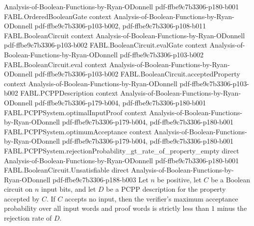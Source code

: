 \begin{theorem}
  {Analysis-of-Boolean-Functions-by-Ryan-ODonnell}
  {pdf-ffbe9c7b3306-p180-b001}
\proofstep
  {FABL.OrderedBooleanGate}
  {context}
  {Analysis-of-Boolean-Functions-by-Ryan-ODonnell}
  {pdf-ffbe9c7b3306-p103-b002,
    pdf-ffbe9c7b3306-p108-b011}
\proofstep
  {FABL.BooleanCircuit}
  {context}
  {Analysis-of-Boolean-Functions-by-Ryan-ODonnell}
  {pdf-ffbe9c7b3306-p103-b002}
\proofstep
  {FABL.BooleanCircuit.evalGate}
  {context}
  {Analysis-of-Boolean-Functions-by-Ryan-ODonnell}
  {pdf-ffbe9c7b3306-p103-b002}
\proofstep
  {FABL.BooleanCircuit.eval}
  {context}
  {Analysis-of-Boolean-Functions-by-Ryan-ODonnell}
  {pdf-ffbe9c7b3306-p103-b002}
\proofstep
  {FABL.BooleanCircuit.acceptedProperty}
  {context}
  {Analysis-of-Boolean-Functions-by-Ryan-ODonnell}
  {pdf-ffbe9c7b3306-p103-b002}
\proofstep
  {FABL.PCPPDescription}
  {context}
  {Analysis-of-Boolean-Functions-by-Ryan-ODonnell}
  {pdf-ffbe9c7b3306-p179-b004,
    pdf-ffbe9c7b3306-p180-b001}
\proofstep
  {FABL.PCPPSystem.optimalInputProof}
  {context}
  {Analysis-of-Boolean-Functions-by-Ryan-ODonnell}
  {pdf-ffbe9c7b3306-p179-b004,
    pdf-ffbe9c7b3306-p180-b001}
\proofstep
  {FABL.PCPPSystem.optimumAcceptance}
  {context}
  {Analysis-of-Boolean-Functions-by-Ryan-ODonnell}
  {pdf-ffbe9c7b3306-p179-b004,
    pdf-ffbe9c7b3306-p180-b001}
\proofstep
  {FABL.PCPPSystem.rejectionProbability_gt_rate_of_property_empty}
  {direct}
  {Analysis-of-Boolean-Functions-by-Ryan-ODonnell}
  {pdf-ffbe9c7b3306-p180-b001}
\proofstep
  {FABL.BooleanCircuit.Unsatisfiable}
  {direct}
  {Analysis-of-Boolean-Functions-by-Ryan-ODonnell}
  {pdf-ffbe9c7b3306-p188-b003}
Let $n$ be positive, let $C$ be a Boolean circuit on $n$ input bits, and let $D$ be a
PCPP description for the property accepted by $C$. If $C$ accepts no input, then the
verifier's maximum acceptance probability over all input words and proof words is
strictly less than $1$ minus the rejection rate of $D$.
\end{theorem}
